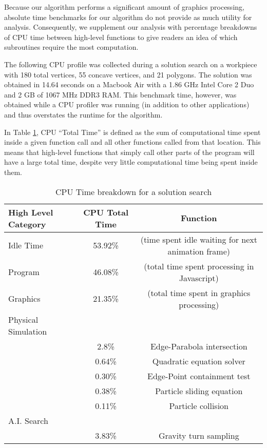 Because our algorithm performs a significant amount of graphics processing, absolute time benchmarks for our algorithm do not provide as much utility for analysis. Consequently, we supplement our analysis with percentage breakdowns of CPU time between high-level functions to give readers an idea of which subroutines require the most computation.

The following CPU profile was collected during a solution search on a workpiece with 180 total vertices, 55 concave vertices, and 21 polygons. The solution was obtained in 14.64 seconds on a Macbook Air with a 1.86 GHz Intel Core 2 Duo and 2 GB of 1067 MHz DDR3 RAM. This benchmark time, however, was obtained while a CPU profiler was running (in addition to other applications) and thus overstates the runtime for the algorithm.

In Table \ref{resultsTable}, CPU ``Total Time'' is defined as the sum of computational time spent inside a given function call and all other functions called from that location. This means that high-level functions that simply call other parts of the program will have a large total time, despite very little computational time being spent inside them.

\begin{table}[H]\label{resultsTable}
\centering
\def\arraystretch{1.2}
\begin{tabular}{|l|c|c|}
\hline
High Level Category & CPU Total Time & Function \\ \hline
Idle Time & 53.92\% & (time spent idle waiting for next animation frame) \\
Program & 46.08\% & (total time spent processing in Javascript) \\
Graphics & 21.35\% &  (total time spent in graphics processing) \\ \hline
Physical Simulation & ~ &  ~ \\ \hline
~ &  2.8\% &  Edge-Parabola intersection \\
~ &  0.64\% & Quadratic equation solver \\
~ &  0.30\% &  Edge-Point containment test \\
~ &  0.38\% & Particle sliding equation \\
~ &  0.11\% & Particle collision \\ \hline
A.I. Search & ~ & ~ \\ \hline
~ &  3.83\% & Gravity turn sampling \\
\hline
\end{tabular}
\caption{CPU Time breakdown for a solution search}
\end{table}

